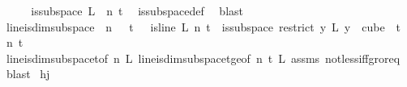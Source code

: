 \begin{isabellebody}
\isanewline
\ \ \isamarkupfalse%
\ \isamarkupfalse%
\ {\isachardoublequoteopen}is{\isacharunderscore}{\kern0pt}subspace\ {\isacharquery}{\kern0pt}L\ {}\ n\ t{\isachardoublequoteclose}\ \isamarkupfalse%
\ is{\isacharunderscore}{\kern0pt}subspace{\isacharunderscore}{\kern0pt}def\ \isamarkupfalse%
\ blast\isanewline
{}\isamarkupfalse%
%
\endisatagproof
{\isafoldproof}%
%
\isadelimproof
\isanewline
%
\endisadelimproof
\isanewline
{}\isamarkupfalse%
\ line{\isacharunderscore}{\kern0pt}is{\isacharunderscore}{\kern0pt}dim{}{\isacharunderscore}{\kern0pt}subspace{\isacharcolon}{\kern0pt}\ \ {\isachardoublequoteopen}n\ {\isachargreater}{\kern0pt}\ {}{\isachardoublequoteclose}\ {\isachardoublequoteopen}t\ {\isachargreater}{\kern0pt}\ {}{\isachardoublequoteclose}\ {\isachardoublequoteopen}is{\isacharunderscore}{\kern0pt}line\ L\ n\ t{\isachardoublequoteclose}\ \ {\isachardoublequoteopen}is{\isacharunderscore}{\kern0pt}subspace\ {\isacharparenleft}{\kern0pt}restrict\ {\isacharparenleft}{\kern0pt}{\isasymlambda}y{\isachardot}{\kern0pt}\ L\ {\isacharparenleft}{\kern0pt}y\ {}{\isacharparenright}{\kern0pt}{\isacharparenright}{\kern0pt}\ {\isacharparenleft}{\kern0pt}cube\ {}\ t{\isacharparenright}{\kern0pt}{\isacharparenright}{\kern0pt}\ {}\ n\ t{\isachardoublequoteclose}\isanewline
%
\isadelimproof
\ \ %
\endisadelimproof
%
\isatagproof
{}\isamarkupfalse%
\ line{\isacharunderscore}{\kern0pt}is{\isacharunderscore}{\kern0pt}dim{}{\isacharunderscore}{\kern0pt}subspace{\isacharunderscore}{\kern0pt}t{\isacharunderscore}{\kern0pt}{}{\isacharbrackleft}{\kern0pt}of\ n\ L{\isacharbrackright}{\kern0pt}\ line{\isacharunderscore}{\kern0pt}is{\isacharunderscore}{\kern0pt}dim{}{\isacharunderscore}{\kern0pt}subspace{\isacharunderscore}{\kern0pt}t{\isacharunderscore}{\kern0pt}ge{\isacharunderscore}{\kern0pt}{}{\isacharbrackleft}{\kern0pt}of\ n\ t\ L{\isacharbrackright}{\kern0pt}\ assms\ not{\isacharunderscore}{\kern0pt}less{\isacharunderscore}{\kern0pt}iff{\isacharunderscore}{\kern0pt}gr{\isacharunderscore}{\kern0pt}or{\isacharunderscore}{\kern0pt}eq\ \isamarkupfalse%
\ blast%
\endisatagproof
{\isafoldproof}%
%
\isadelimproof
\isanewline
%
\endisadelimproof
\isanewline
{}\isamarkupfalse%
\ hj\ \isanewline

\end{isabellebody}
